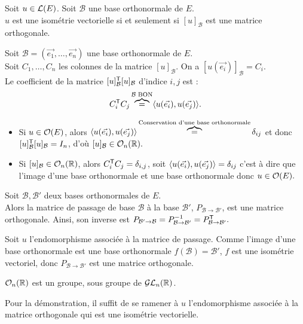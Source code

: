\documentclass{book}
\begin{document}
\begin{Theoreme}
Soit $u\in\mathcal{L}(E)$. Soit $\mathcal{B}$ une base orthonormale de $E$.\\
$u$ est une isométrie vectorielle si et seulement si $[u]_\mathcal{B}$ est une matrice orthogonale.
\end{Theoreme}
\begin{Demonstration}
Soit $\mathcal{B}=(\vec{e_1},\dots,\vec{e_n})$ une base orthonormale de $E$.\\
Soit $C_1,\dots,C_n$ les colonnes de la matrice $[u]_\mathcal{B}$. On a  $[u(\vec{e_i})]_{\mathcal{B}}=C_i$.\\
Le coefficient de la matrice $[u]_{\mathcal{B}}^{\mathsf {T}}[u]_{\mathcal{B}} $ d'indice $i,j$ est :\\
$$C_i^{\mathsf {T}}C_j\overbrace{=}^{\mathcal{B} \text{ BON}}\langle u(\vec{e_i}),u(\vec{e_j})\rangle.$$
\begin{itemize}
\item Si $u\in\mathcal{O}(E)$, alors $\langle u(\vec{e_i}),u(\vec{e_j})\rangle\overbrace{=}^{\text{Conservation d'une base orthonormale}}\delta_{ij}$ et donc $[u]_{\mathcal{B}}^{\mathsf {T}}[u]_{\mathcal{B}} =I_n$, d'où $[u]_{\mathcal{B}}\in \mathcal{O}_{n}(\mathbb{R}).$
\item Si $[u]_\mathcal{B}\in\mathcal{O}_{n}(\mathbb{R})$, alors $C_i^{\mathsf {T}}C_j=\delta_{i,j}$, soit $\langle u(\vec{e_i}),u(\vec{e_j})\rangle=\delta_{ij}$ c'est à dire que l'image d'une base orthonormale et une  base orthonormale donc  $u\in\mathcal{O}(E).$
\end{itemize}
\end{Demonstration}
\begin{Proposition}
Soit $\mathcal{B},\mathcal{B}'$ deux bases orthonormales de $E$.\\
Alors la matrice de passage de base $\mathcal{B}$ à la base $\mathcal{B}'$, $P_{\mathcal{B}\to\mathcal{B}'}$, est une matrice orthogonale. 
Ainsi, son inverse est $P_{\mathcal{B}'\to\mathcal{B}}=  P^{-1}_{\mathcal{B}\to\mathcal{B}'}=P_{\mathcal{B}\to\mathcal{B}'}^{\mathsf {T}}.$
\end{Proposition}
\begin{Demonstration}
Soit $u$ l'endomorphisme associée à la matrice de passage. Comme l'image d'une base orthonormale est une base orthonormale $f(\mathcal{B})=\mathcal{B}'$,  $f$ est une isométrie vectoriel, donc  $P_{\mathcal{B}\to\mathcal{B}'}$ est une matrice orthogonale.
\end{Demonstration}
\begin{Proposition}[Groupe]
$\mathcal{O}_{n}(\mathbb{R})$ est un groupe, sous groupe de $\mathcal{GL}_{n}(\mathbb{R})$.
\end{Proposition}
\begin{Demonstration}
Pour la démonstration, il suffit de se ramener à $u$ l'endomorphisme associée à la matrice orthogonale qui est une isométrie vectorielle.
\end{Demonstration}
\end{document}
